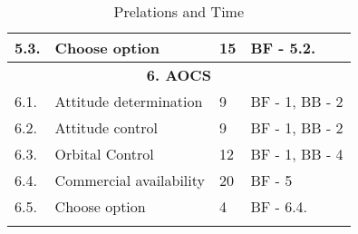 \begin{longtable}{ | p{1.3cm} | p{7cm} | p{3cm} | p{3.5cm} |}
	5.3. & Choose option & 15 & BF - 5.2.\\ \hline
	\multicolumn{4}{|c|}{\textbf{6. AOCS}} \\ \hline
	6.1. & Attitude determination& 9 & BF - 1, BB - 2  \\ \hline
	6.2. & Attitude control & 9 & BF - 1, BB - 2\\ \hline
	6.3. & Orbital Control & 12 & BF - 1, BB - 4 \\ \hline
	6.4. & Commercial availability  & 20 & BF - 5 \\ \hline
	6.5. & Choose option & 4 &  BF - 6.4.\\ \hline
	\caption{Prelations and Time} \\
\end{longtable}


